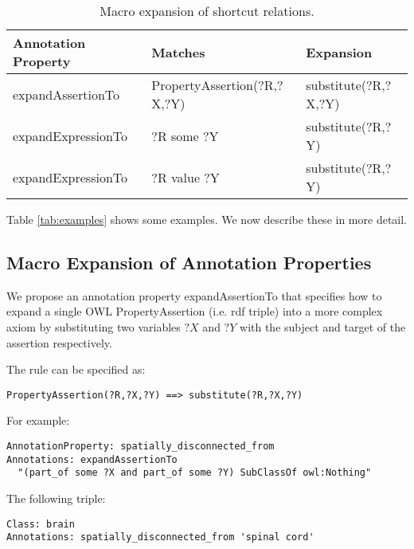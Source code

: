\documentclass[11pt]{article}
\begin{document}
  \begin{table}
    \begin{tabular}{ | p{4cm} | p{5cm} | p{5cm} | }
      \hline 
      \textbf{Annotation Property} & \textbf{Matches} & \textbf{Expansion} \\

      \hline
      expandAssertionTo & PropertyAssertion(?R,?X,?Y) & substitute(?R,?X,?Y) \\

      \hline
      expandExpressionTo & ?R some ?Y & substitute(?R,?Y) \\

      \hline
      expandExpressionTo & ?R value ?Y & substitute(?R,?Y) \\

      \hline
    \end{tabular}
    \caption{Macro expansion of shortcut relations.}
    \label{tab:macro-expansion}
  \end{table}

Table \ref{tab:examples} shows some examples. We now describe these in more detail.

\subsection{Macro Expansion of Annotation Properties}

We propose an annotation property expandAssertionTo that specifies how to expand
a single OWL PropertyAssertion (i.e. rdf triple) into a more complex
axiom by substituting two variables $?X$ and $?Y$ with the subject and
target of the assertion respectively.

The rule can be specified as:

\begin{verbatim}
PropertyAssertion(?R,?X,?Y) ==> substitute(?R,?X,?Y)
\end{verbatim}

For example:

\begin{verbatim}
AnnotationProperty: spatially_disconnected_from
Annotations: expandAssertionTo 
  "(part_of some ?X and part_of some ?Y) SubClassOf owl:Nothing"
\end{verbatim}

The following triple:

\begin{verbatim}
Class: brain
Annotations: spatially_disconnected_from 'spinal cord'
\end{verbatim}
\end{document}
